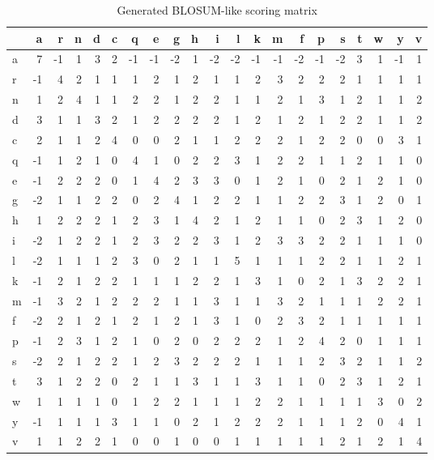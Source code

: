 \documentclass[a4paper,11pt]{article}
\begin{document}
\begin{table}[!hbp]
	\centering
	\begin{tabular}{l|*{20}{r} }
		& a  & r  & n & d & c & q  & e  & g  & h & i  & l  & k  & m  & f  & p  & s  & t & w & y  & v \\ \hline
		a & 7  & -1 & 1 & 3 & 2 & -1 & -1 & -2 & 1 & -2 & -2 & -1 & -1 & -2 & -1 & -2 & 3 & 1 & -1 & 1 \\
		r & -1 & 4  & 2 & 1 & 1 & 1  & 2  & 1  & 2 & 1  & 1  & 2  & 3  & 2  & 2  & 2  & 1 & 1 & 1  & 1 \\
		n & 1  & 2  & 4 & 1 & 1 & 2  & 2  & 1  & 2 & 2  & 1  & 1  & 2  & 1  & 3  & 1  & 2 & 1 & 1  & 2 \\
		d & 3  & 1  & 1 & 3 & 2 & 1  & 2  & 2  & 2 & 2  & 1  & 2  & 1  & 2  & 1  & 2  & 2 & 1 & 1  & 2 \\
		c & 2  & 1  & 1 & 2 & 4 & 0  & 0  & 2  & 1 & 1  & 2  & 2  & 2  & 1  & 2  & 2  & 0 & 0 & 3  & 1 \\
		q & -1 & 1  & 2 & 1 & 0 & 4  & 1  & 0  & 2 & 2  & 3  & 1  & 2  & 2  & 1  & 1  & 2 & 1 & 1  & 0 \\
		e & -1 & 2  & 2 & 2 & 0 & 1  & 4  & 2  & 3 & 3  & 0  & 1  & 2  & 1  & 0  & 2  & 1 & 2 & 1  & 0 \\
		g & -2 & 1  & 1 & 2 & 2 & 0  & 2  & 4  & 1 & 2  & 2  & 1  & 1  & 2  & 2  & 3  & 1 & 2 & 0  & 1 \\
		h & 1  & 2  & 2 & 2 & 1 & 2  & 3  & 1  & 4 & 2  & 1  & 2  & 1  & 1  & 0  & 2  & 3 & 1 & 2  & 0 \\
		i & -2 & 1  & 2 & 2 & 1 & 2  & 3  & 2  & 2 & 3  & 1  & 2  & 3  & 3  & 2  & 2  & 1 & 1 & 1  & 0 \\
		l & -2 & 1  & 1 & 1 & 2 & 3  & 0  & 2  & 1 & 1  & 5  & 1  & 1  & 1  & 2  & 2  & 1 & 1 & 2  & 1 \\
		k & -1 & 2  & 1 & 2 & 2 & 1  & 1  & 1  & 2 & 2  & 1  & 3  & 1  & 0  & 2  & 1  & 3 & 2 & 2  & 1 \\
		m & -1 & 3  & 2 & 1 & 2 & 2  & 2  & 1  & 1 & 3  & 1  & 1  & 3  & 2  & 1  & 1  & 1 & 2 & 2  & 1 \\
		f & -2 & 2  & 1 & 2 & 1 & 2  & 1  & 2  & 1 & 3  & 1  & 0  & 2  & 3  & 2  & 1  & 1 & 1 & 1  & 1 \\
		p & -1 & 2  & 3 & 1 & 2 & 1  & 0  & 2  & 0 & 2  & 2  & 2  & 1  & 2  & 4  & 2  & 0 & 1 & 1  & 1 \\
		s & -2 & 2  & 1 & 2 & 2 & 1  & 2  & 3  & 2 & 2  & 2  & 1  & 1  & 1  & 2  & 3  & 2 & 1 & 1  & 2 \\
		t & 3  & 1  & 2 & 2 & 0 & 2  & 1  & 1  & 3 & 1  & 1  & 3  & 1  & 1  & 0  & 2  & 3 & 1 & 2  & 1 \\
		w & 1  & 1  & 1 & 1 & 0 & 1  & 2  & 2  & 1 & 1  & 1  & 2  & 2  & 1  & 1  & 1  & 1 & 3 & 0  & 2 \\
		y & -1 & 1  & 1 & 1 & 3 & 1  & 1  & 0  & 2 & 1  & 2  & 2  & 2  & 1  & 1  & 1  & 2 & 0 & 4  & 1 \\
		v & 1  & 1  & 2 & 2 & 1 & 0  & 0  & 1  & 0 & 0  & 1  & 1  & 1  & 1  & 1  & 2  & 1 & 2 & 1  & 4\\
		\hline
	\end{tabular}
	\caption{Generated BLOSUM-like scoring matrix}
    \label{substitutions}
\end{table}
\end{document}

